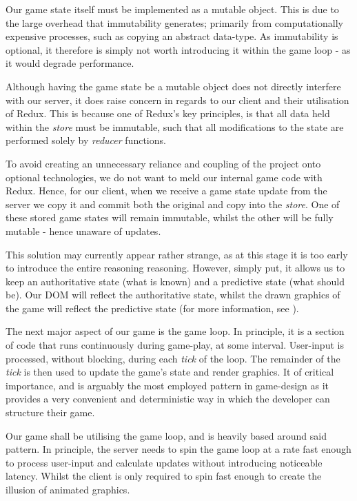 \documentclass{standalone}
\begin{document}
		Our game state itself must be implemented as a mutable object. This is due to the large overhead that immutability generates; primarily from computationally expensive processes, such as copying an abstract data-type. As immutability is optional, it therefore is simply not worth introducing it within the game loop - as it would degrade performance.

		Although having the game state be a mutable object does not directly interfere with our server, it does raise concern in regards to our client and their utilisation of Redux. This is because one of Redux's key principles, is that all data held within the \emph{store} must be immutable, such that all modifications to the state are performed solely by \emph{reducer} functions.

		To avoid creating an unnecessary reliance and coupling of the project onto optional technologies, we do not want to meld our internal game code with Redux. Hence, for our client, when we receive a game state update from the server we copy it and commit both the original and copy into the \emph{store}. One of these stored game states will remain immutable, whilst the other will be fully mutable - hence unaware of updates.

		This solution may currently appear rather strange, as at this stage it is too early to introduce the entire reasoning reasoning. However, simply put, it allows us to keep an authoritative state (what is known) and a predictive state (what should be). Our DOM will reflect the authoritative state, whilst the drawn graphics of the game will reflect the predictive state (for more information, see ).

		The next major aspect of our game is the game loop. In principle, it is a section of code that runs continuously during game-play, at some interval. User-input is processed, without blocking, during each \emph{tick} of the loop. The remainder of the \emph{tick} is then used to update the game's state and render graphics. It of critical importance, and is arguably the most employed pattern in game-design as it provides a very convenient and deterministic way in which the developer can structure their game.

		Our game shall be utilising the game loop, and is heavily based around said pattern. In principle, the server needs to spin the game loop at a rate fast enough to process user-input and calculate updates without introducing noticeable latency. Whilst the client is only required to spin fast enough to create the illusion of animated graphics.
\end{document}

